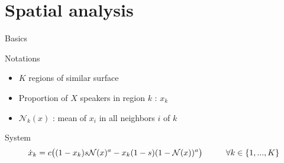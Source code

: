 \documentclass[10pt]{beamer}
\begin{document}
\section{Spatial analysis}

\begin{frame}{Basics}

\begin{alertblock}{Notations}
\begin{itemize}
\item $K$ regions of similar surface
\item Proportion of $X$ speakers in region $k$ : $x_k$
\item $\mathcal{N}_k(x)$ : mean of $x_i$ in all neighbors $i$ of $k$
\end{itemize}
\end{alertblock}

\begin{exampleblock}{System}
\begin{equation*}
\dot{x}_k = c\big( (1-x_k)s\mathcal{N}(x)^a - x_k(1-s)(1-\mathcal{N}(x))^a \big) \hspace{1cm} \forall k \in \{1,...,K\}
\end{equation*}
\end{exampleblock}

\end{frame}
\end{document}
